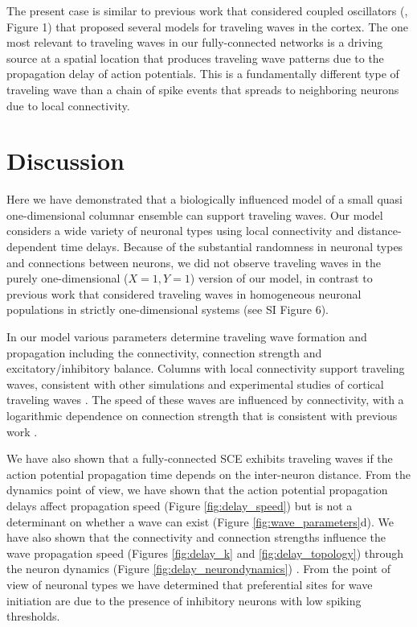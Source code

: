 \documentclass[12pt]{article}
\begin{document}
The present case is similar to previous work that considered coupled oscillators  (\parencite{ermentrout2001}, Figure 1) that proposed several models for traveling waves in the cortex.
The one most relevant to traveling waves in our fully-connected networks is a driving source at a spatial location that produces traveling wave patterns due to the propagation delay of action potentials.
This is a fundamentally different type of traveling wave than a chain of spike events that spreads to neighboring neurons due to local connectivity.

\section{Discussion}
 
Here we have demonstrated that a biologically influenced model of a small quasi one-dimensional columnar ensemble  can support traveling waves. 
Our model considers a wide variety of neuronal types using local connectivity and distance-dependent time delays.
Because of the substantial randomness in neuronal types and connections between neurons, we did not observe traveling waves in the purely one-dimensional ($X=1,Y=1$) version of our model, in contrast to previous work that considered traveling waves in homogeneous neuronal populations in strictly one-dimensional systems (see SI Figure 6). 

In our model various parameters determine traveling wave formation and propagation including the connectivity, connection strength and excitatory/inhibitory balance.
Columns with local connectivity support traveling waves, consistent with other simulations and experimental studies of cortical traveling waves \parencite{Kopell1986}\parencite{ermentrout2001}\parencite{Golomb1999} .
The speed of these waves are influenced by connectivity, with a logarithmic dependence on connection strength that is consistent with previous work \parencite{Golomb1996}\parencite{Golomb1999}.

We have also shown that  a fully-connected SCE exhibits traveling waves if the action potential propagation time depends on the inter-neuron distance. 
From the dynamics point of view, we have shown that the action potential propagation delays affect propagation speed (Figure \ref{fig:delay_speed}) but is not a determinant on whether a wave can exist (Figure \ref{fig:wave_parameters}d).
We have also shown that  the connectivity and connection strengths influence the wave propagation speed (Figures \ref{fig:delay_k} and \ref{fig:delay_topology})  through the neuron dynamics (Figure \ref{fig:delay_neurondynamics}) .
From the point of view of neuronal types  we have determined that preferential sites for wave initiation are due to the presence of inhibitory neurons with low spiking thresholds.
\end{document}
